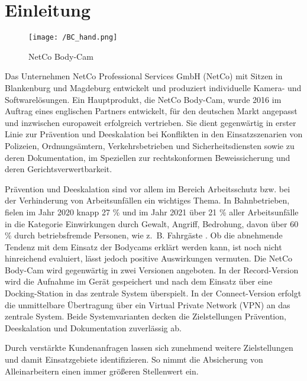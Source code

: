 \documentclass[thesis.tex]{subfiles}
\begin{document}
\chapter{Einleitung}
\label{chap:Einleitung}

\begin{figure}[h]
    \centering
    \texttt{[image: /BC\_hand.png]}
    \caption{NetCo Body-Cam}
    \label{fig:BC}
\end{figure}

Das Unternehmen NetCo Professional Services GmbH (NetCo) mit Sitzen in Blankenburg und Magdeburg entwickelt und produziert individuelle Kamera- und Softwarelösungen.
Ein Hauptprodukt, die NetCo Body-Cam, wurde 2016 im Auftrag eines englischen Partners entwickelt, für den deutschen Markt angepasst und inzwischen europaweit erfolgreich vertrieben.
Sie dient gegenwärtig in erster Linie zur Prävention und Deeskalation bei Konflikten in den Einsatzszenarien von Polizeien, Ordnungsämtern, Verkehrsbetrieben und Sicherheitsdiensten sowie zu deren Dokumentation, im Speziellen zur rechtskonformen Beweissicherung und deren Gerichtsverwertbarkeit.

Prävention und Deeskalation sind vor allem im Bereich Arbeitsschutz bzw. bei der Verhinderung von Arbeitsunfällen ein wichtiges Thema.
In Bahnbetrieben, fielen im Jahr 2020 knapp 27 \% und im Jahr 2021 über 21 \% aller Arbeitsunfälle in die Kategorie \glqq Einwirkungen durch Gewalt, Angriff, Bedrohung\grqq{}, davon über 60 \% durch betriebsfremde Personen, wie z.~B. Fahrgäste \cite[vgl. S.87 ff.]{Unfallgeschehen2020,Unfallgeschehen2021}.
Ob die abnehmende Tendenz mit dem Einsatz der Bodycams erklärt werden kann, ist noch nicht hinreichend evaluiert, lässt jedoch positive Auswirkungen vermuten.
Die NetCo Body-Cam wird gegenwärtig in zwei Versionen angeboten.
In der Record-Version wird die Aufnahme im Gerät gespeichert und nach dem Einsatz über eine Docking-Station in das zentrale System überspielt.
In der Connect-Version erfolgt die unmittelbare Übertragung über ein \glqq Virtual Private Network\grqq{} (VPN) an das zentrale System.
Beide Systemvarianten decken die Zielstellungen Prävention, Deeskalation und Dokumentation zuverlässig ab.

Durch verstärkte Kundenanfragen lassen sich zunehmend weitere Zielstellungen und damit Einsatzgebiete identifizieren.
So nimmt die Absicherung von Alleinarbeitern einen immer größeren Stellenwert ein.
\end{document}
